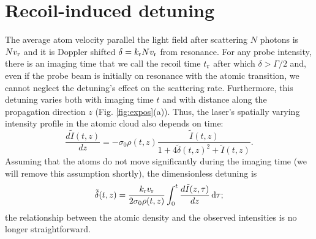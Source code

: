 \section{Recoil-induced detuning}


\par The average atom velocity parallel the light field after scattering $N$ photons is $N v_{\rm{r}}$ and it is Doppler shifted  $\delta= k_{\rm{r}} N v_{\rm{r}}$ from resonance. For any probe intensity, there is an imaging time that we call the recoil time $t_{\rm{r}}$ after which  $\delta>\Gamma/2$ and, even if the probe beam is initially on resonance with the atomic transition, we cannot neglect the detuning's  effect on the scattering rate. Furthermore, this detuning varies both with imaging time $t$ and with distance along the propagation direction $z$ (Fig. \ref{fig:expos}(a)). Thus, the laser's spatially varying intensity profile in the atomic cloud also depends on time:
\begin{equation}
\frac{d\tilde{I}(t,z)}{dz}=-\sigma_0 \rho(t,z) \frac{\tilde{I}(t,z)}{1+4\tilde{\delta}(t,z)^2 +\tilde{I}(t,z)}. \label{eq3}
\end{equation}
Assuming that the atoms do not move significantly during the imaging time (we will remove this assumption shortly), the dimensionless detuning is
\begin{equation}
\tilde{\delta}(t,z)=\frac{ k_{\rm{r}} v_{\rm{r}}}{2\sigma_0 \rho(t,z)}\int_0^t \frac{d\tilde{I}(z,\tau)}{dz}\,\mathrm{d}\tau; \label{eq4}
\end{equation}
the relationship between the atomic density and the observed intensities is no longer straightforward.
